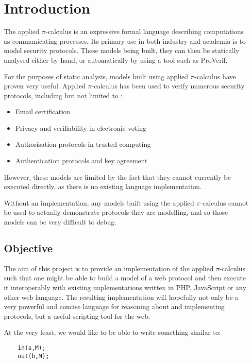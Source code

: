 \section{Introduction}

The applied $\pi$-calculus is an expressive formal language describing computations as communicating processes. Its primary use in both industry and academia is to model security protocols. These models being built, they can then be statically analysed either by hand, or automatically by using a tool such as ProVerif. 

For the purposes of static analysis, models built using applied $\pi$-calculus have proven very useful. Applied $\pi$-calculus has been used to verify numerous security protocols, including but not limited to \cite{rs13}:
\begin{itemize}
    \item Email certification
    \item Privacy and verifiability in electronic voting
    \item Authorisation protocols in trusted computing
    \item Authentication protocols and key agreement
\end{itemize} 
However, these models are limited by the fact that they cannot currently be executed directly, as there is no existing language implementation. 

Without an implementation, any models built using the applied $\pi$-calculus cannot be used to actually demonstrate protocols they are modelling, and so those models can be very difficult to debug.

\subsection{Objective}

The aim of this project is to provide an implementation of the applied $\pi$-calculus such that one might be able to build a model of a web protocol and then execute it interoperably with existing implementations written in PHP, JavaScript or any other web language. The resulting implementation will hopefully not only be a very powerful and concise language for reasoning about and implementing protocols, but a useful scripting tool for the web.

At the very least, we would like to be able to write something similar to:
    
\begin{verbatim}
    in(a,M); 
    out(b,M);
\end{verbatim}

